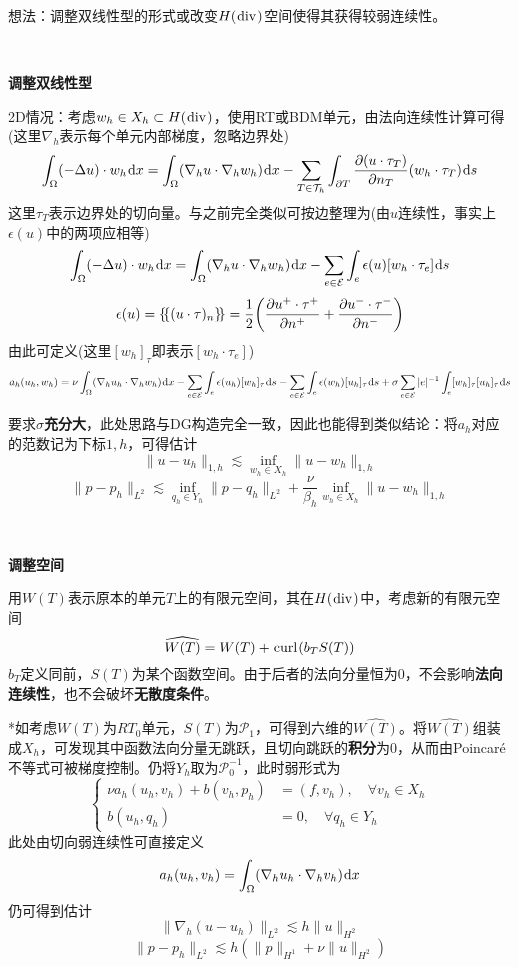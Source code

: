 \documentclass[a4paper,UTF8,fontset=windows]{ctexart}
\newcommand*{\dr}{\hspace{0.07em}\mathrm{d}}
\newcommand*{\ce}{\mathcal{E}}
\newcommand*{\cp}{\mathcal{P}}
\newcommand*{\ct}{\mathcal{T}}
\renewcommand*{\div}{\hspace{0.07em}\mathrm{div}\hspace{0.07em}}
\newcommand*{\curl}{\hspace{0.07em}\mathrm{curl}\hspace{0.07em}}
\newcommand*{\ave}[1]{\left\{\hspace{-0.2em}\left\{#1\right\}\hspace{-0.2em}\right\}}
\begin{document}
想法：调整双线性型的形式或改变$H(\div)$空间使得其获得较弱连续性。

\

\textbf{调整双线性型}

2D情况：考虑$w_h\in X_h\subset H(\div)$，使用RT或BDM单元，由法向连续性计算可得(这里$\nabla_h$表示每个单元内部梯度，忽略边界处)
$$\int_\Omega(-\Delta u)\cdot w_h\dr x=\int_\Omega(\nabla_h u\cdot\nabla_h w_h)\dr x-\sum_{T\in\ct_h}\int_{\partial T}\frac{\partial(u\cdot\tau_T)}{\partial n_T}(w_h\cdot\tau_T)\dr s$$
这里$\tau_T$表示边界处的切向量。与之前完全类似可按边整理为(由$u$连续性，事实上$\epsilon(u)$中的两项应相等)
$$\int_\Omega(-\Delta u)\cdot w_h\dr x=\int_\Omega(\nabla_h u\cdot\nabla_h w_h)\dr x-\sum_{e\in\ce}\int_e\epsilon(u)[w_h\cdot\tau_e]\dr s$$
$$\epsilon(u)=\ave{(u\cdot\tau)_n}=\frac{1}{2}\bigg(\frac{\partial u^+\cdot\tau^+}{\partial n^+}+\frac{\partial u^-\cdot\tau^-}{\partial n^-}\bigg)$$
由此可定义(这里$[w_h]_\tau$即表示$[w_h\cdot\tau_e]$)
$$a_h(u_h,w_h)=\nu\int_\Omega(\nabla_h u_h\cdot\nabla_h w_h)\dr x-\sum_{e\in\ce}\int_e\epsilon(u_h)[w_h]_\tau\dr s-\sum_{e\in\ce}\int_e\epsilon(w_h)[u_h]_\tau\dr s+\sigma\sum_{e\in\ce}|e|^{-1}\int_e[w_h]_\tau[u_h]_\tau\dr s$$

要求$\sigma$\textbf{充分大}，此处思路与DG构造完全一致，因此也能得到类似结论：将$a_h$对应的范数记为下标$1,h$，可得估计
$$\|u-u_h\|_{1,h}\lesssim\inf_{w_h\in X_h}\|u-w_h\|_{1,h}$$
$$\|p-p_h\|_{L^2}\lesssim\inf_{q_h\in Y_h}\|p-q_h\|_{L^2}+\frac{\nu}{\beta_h}\inf_{w_h\in X_h}\|u-w_h\|_{1,h}$$

\

\textbf{调整空间}

用$W(T)$表示原本的单元$T$上的有限元空间，其在$H(\div)$中，考虑新的有限元空间
$$\widehat{W(T)}=W(T)+\curl(b_TS(T))$$
$b_T$定义同前，$S(T)$为某个函数空间。由于后者的法向分量恒为0，不会影响\textbf{法向连续性}，也不会破坏\textbf{无散度条件}。

*如考虑$W(T)$为$RT_0$单元，$S(T)$为$\cp_1$，可得到六维的$\widehat{W(T)}$。将$\widehat{W(T)}$组装成$X_h$，可发现其中函数法向分量无跳跃，且切向跳跃的\textbf{积分}为0，从而由Poincar\'e不等式可被梯度控制。仍将$Y_h$取为$\cp_0^{-1}$，此时弱形式为
$$\begin{cases}\nu a_h(u_h,v_h)+b(v_h,p_h)&=(f,v_h),\quad\forall v_h\in X_h\\b(u_h,q_h)&=0,\quad\forall q_h\in Y_h\end{cases}$$
此处由切向弱连续性可直接定义
$$a_h(u_h,v_h)=\int_\Omega(\nabla_h u_h\cdot\nabla_h v_h)\dr x$$
仍可得到估计
$$\|\nabla_h(u-u_h)\|_{L^2}\lesssim h\|u\|_{H^2}$$
$$\|p-p_h\|_{L^2}\lesssim h(\|p\|_{H^1}+\nu\|u\|_{H^2})$$
\end{document}
